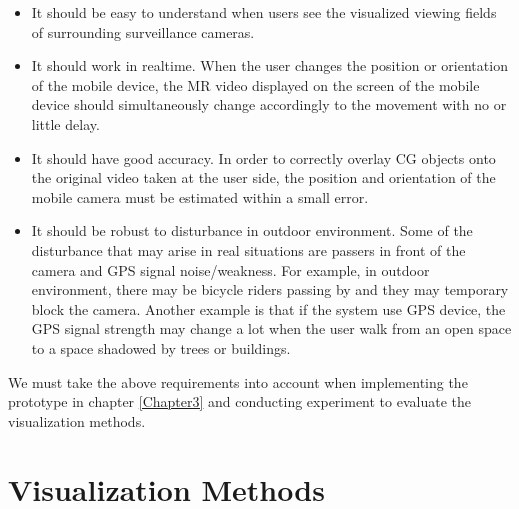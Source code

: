 \begin{itemize}
	\item It should be easy to understand when users see the visualized viewing fields of surrounding surveillance cameras.
	\item It should work in realtime. When the user changes the position or orientation of the mobile device, the MR video displayed on the screen of the mobile device should simultaneously change accordingly to the movement with no or little delay.
	\item It should have good accuracy. In order to correctly overlay CG objects onto the original video taken at the user side, the position and orientation of the mobile camera must be estimated within a small error.
	\item It should be robust to disturbance in outdoor environment. Some of the disturbance that may arise in real situations are passers in front of the camera and GPS signal noise/weakness. For example, in outdoor environment, there may be bicycle riders passing by and they may temporary block the camera. Another example is that if the system use GPS device, the GPS signal strength may change a lot when the user walk from an open space to a space shadowed by trees or buildings.
\end{itemize}

We must take the above requirements into account when implementing the prototype in chapter \ref{Chapter3} and conducting experiment to evaluate the visualization methods.


\section{Visualization Methods}
\label{VisualizationMethods}

